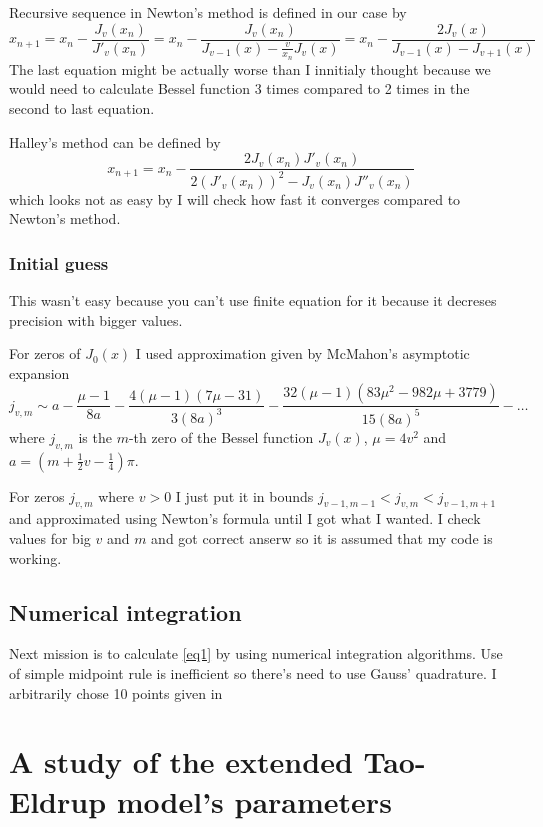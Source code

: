 \documentclass[a4paper]{article}
\begin{document}
	Recursive sequence in Newton's method is defined in our case by
	\begin{equation*}
		x_{n+1} = x_n - \frac{J_v(x_n)}{J'_v(x_n)} = 
			x_n - \frac{J_v(x_n)}{J_{v-1}(x) - \frac{v}{x_n}J_v(x)} =
			x_n - \frac{2J_v(x)}{J_{v-1}(x) - J_{v+1}(x)}
	\end{equation*}
	The last equation might be actually worse than I innitialy thought
	because we would need to calculate Bessel function 3 times compared to 2 times
	in the second to last equation.

	Halley's method can be defined by
	\begin{equation*}
		x_{n+1} = x_n - \frac{2J_v(x_n)J'_v(x_n)}{2(J'_v(x_n))^2 - J_v(x_n)J''_v(x_n)}
	\end{equation*}
	which looks not as easy by I will check how fast it converges compared to
	Newton's method.
	\subsubsection{Initial guess}
	This wasn't easy because you can't use finite equation for 
	it because it decreses precision with bigger values.

	For zeros of $J_0(x)$ I used approximation given by McMahon's
	asymptotic expansion \cite[equation 10.21.19]{NIST:DLMF}	
	\begin{equation}
		j_{v,m} \sim a - \frac{\mu - 1}{8a} - \frac{4(\mu -1)(7\mu-31)}{3(8a)^3}
			- \frac{32(\mu-1)(83\mu^2-982\mu+3779)}{15(8a)^5} - \dots
	\end{equation}
	where $j_{v,m}$ is the $m$-th zero of the Bessel function $J_v(x)$,
	$\mu=4v^2$ and $a=(m+\frac{1}{2}v-\frac{1}{4})\pi$.
	
	For zeros $j_{v,m}$ where $v > 0$ I just put it in bounds $j_{v-1,m-1} < j_{v,m} < j_{v-1,m+1}$
	\cite[equation 10.21.2]{NIST:DLMF} and approximated using Newton's formula until I got what I wanted. I check values for
	big $v$ and $m$ and got correct anserw so it is assumed that my code is working.

	\subsection{Numerical integration}
	Next mission is to calculate \ref{eq1} by using numerical 
	integration algorithms.
	Use of simple midpoint rule is inefficient so there's need to use Gauss'
	quadrature. I arbitrarily chose 10 points given in \cite[table 3.5.2]{NIST:DLMF}
	\section{A study of the extended Tao-Eldrup model's parameters}
\end{document}
